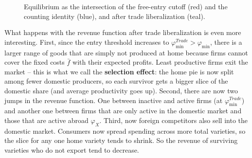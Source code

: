 \documentclass[11pt,letterpaper]{article}
\begin{document}
\begin{figure}[htp]
    \caption{Equilibrium as the intersection of the free-entry cutoff (red) and the counting identity (blue), and after trade liberalization (teal).}
    \label{fig: trade-liberalization}
\end{figure}

What happens with the revenue function after trade liberalization is even more interesting. First, since the entry threshold increases to $\varphi_{\min}^{Trade}>\varphi_{\min}$, there is a larger range of goods that are simply not produced at home because firms cannot cover the fixed costs $\bar{f}$ with their expected profits. Least productive firms exit the market -- this is what we call the \textbf{selection effect}: the home pie is now split among fewer domestic producers, so each survivor gets a bigger slice of the domestic share (and average productivity goes up). Second, there are now two jumps in the revenue function. One between inactive and active firms (at $\varphi_{\min}^{Trade}$) and another one between firms that are only active in the domestic market and those that are active abroad $\varphi_X$. Third, now foreign competitors also sell into the domestic market. Consumers now spread spending across more total varieties, so the slice for any one home variety tends to shrink. So the revenue of surviving varieties who do not export tend to decrease.
\end{document}
